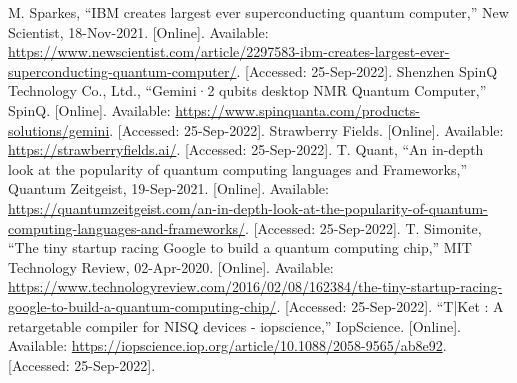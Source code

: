 \documentclass[conference]{IEEEtran}
\begin{document}
\begin{thebibliography}{00}
 M. Sparkes, “IBM creates largest ever superconducting quantum computer,” New Scientist, 18-Nov-2021. [Online]. Available: \href{https://www.newscientist.com/article/2297583-ibm-creates-largest-ever-superconducting-quantum-computer/}{https://www.newscientist.com/article/2297583-ibm-creates-largest-ever-superconducting-quantum-computer/}. [Accessed: 25-Sep-2022]. 
 Shenzhen SpinQ Technology Co., Ltd., “Gemini·2 qubits desktop NMR Quantum Computer,” SpinQ. [Online]. Available: \href{https://www.spinquanta.com/products-solutions/gemini}{https://www.spinquanta.com/products-solutions/gemini}. [Accessed: 25-Sep-2022]. 
 Strawberry Fields. [Online]. Available: \href{https://strawberryfields.ai/}{https://strawberryfields.ai/}. [Accessed: 25-Sep-2022]. 
 T. Quant, “An in-depth look at the popularity of quantum computing languages and Frameworks,” Quantum Zeitgeist, 19-Sep-2021. [Online]. Available: \href{https://quantumzeitgeist.com/an-in-depth-look-at-the-popularity-of-quantum-computing-languages-and-frameworks/}{https://quantumzeitgeist.com/an-in-depth-look-at-the-popularity-of-quantum-computing-languages-and-frameworks/}. [Accessed: 25-Sep-2022]. 
 T. Simonite, “The tiny startup racing Google to build a quantum computing chip,” MIT Technology Review, 02-Apr-2020. [Online]. Available: \href{https://www.technologyreview.com/2016/02/08/162384/the-tiny-startup-racing-google-to-build-a-quantum-computing-chip/}{https://www.technologyreview.com/2016/02/08/162384/the-tiny-startup-racing-google-to-build-a-quantum-computing-chip/}. [Accessed: 25-Sep-2022]. 
 “T|Ket : A retargetable compiler for NISQ devices - iopscience,” IopScience. [Online]. Available: \href{https://iopscience.iop.org/article/10.1088/2058-9565/ab8e92}{https://iopscience.iop.org/article/10.1088/2058-9565/ab8e92}. [Accessed: 25-Sep-2022]. 
\end{thebibliography}
\end{document}
